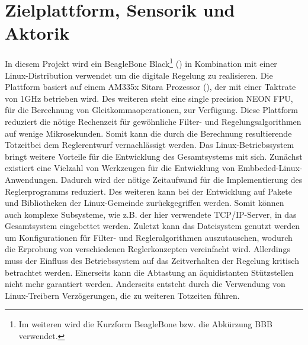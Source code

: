 \section{Zielplattform, Sensorik und Aktorik}
In diesem Projekt wird ein BeagleBone Black\footnote{Im weiteren wird die Kurzform BeagleBone bzw. die Abkürzung BBB verwendet.} (\cite{BBBSRM}) in Kombination mit einer Linux-Distribution verwendet um die digitale Regelung zu realisieren. Die Plattform basiert auf einem AM335x Sitara  Prozessor (\cite{AM335x}), der mit einer Taktrate von 1GHz betrieben wird. Des weiteren steht eine single precision NEON FPU, für die Berechnung von Gleitkommaoperationen, zur Verfügung. Diese Plattform reduziert die nötige Rechenzeit für gewöhnliche Filter- und Regelungsalgorithmen auf wenige Mikrosekunden. Somit kann die durch die Berechnung resultierende Totzeitbei dem Reglerentwurf vernachlässigt werden.
Das Linux-Betriebssystem bringt weitere Vorteile für die Entwicklung des Gesamtsystems mit sich. Zunächst existiert eine Vielzahl von Werkzeugen für die Entwicklung von Embbeded-Linux-Anwendungen. Dadurch wird der nötige Zeitaufwand für die Implementierung des Reglerprogramms reduziert. Des weiteren kann bei der Entwicklung auf Pakete und Bibliotheken der Linux-Gemeinde zurückgegriffen werden. Somit können auch komplexe Subsysteme, wie z.B. der hier verwendete TCP/IP-Server, in das Gesamtsystem eingebettet werden. Zuletzt kann das Dateisystem genutzt werden um Konfigurationen für Filter- und Regleralgorithmen auszutauschen, wodurch die Erprobung von verschiedenen Reglerkonzepten vereinfacht wird. 
Allerdings muss der Einfluss des Betriebssystem auf das Zeitverhalten der Regelung kritisch betrachtet werden. Einerseits kann die Abtastung an äquidistanten Stützstellen nicht mehr garantiert werden. Anderseits entsteht durch die Verwendung von Linux-Treibern Verzögerungen, die zu weiteren Totzeiten führen.

